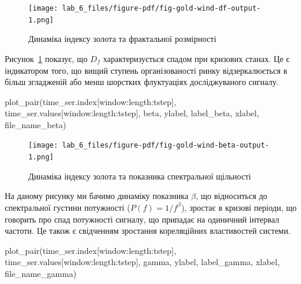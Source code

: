 \documentclass[
  letterpaper,
]{report}
\newenvironment{Shaded}{\begin{snugshade}}{\end{snugshade}}
\newcommand{\NormalTok}[1]{\textcolor[rgb]{0.00,0.23,0.31}{#1}}
\begin{document}
\begin{figure}[H]

{\centering \texttt{[image: lab\_6\_files/figure-pdf/fig-gold-wind-df-output-1.png]}

}

\caption{\label{fig-gold-wind-df}Динаміка індексу золота та фрактальної
розмірності}

\end{figure}

Рисунок~\ref{fig-gold-wind-df} показує, що \(D_f\) характеризується
спадом при кризових станах. Це є індикатором того, що вищий ступень
організованості ринку відзеркалюється в більш згладженій або менш
шорстких флуктуаціях досліджуваного сигналу.

\begin{Shaded}
\begin{Highlighting}[]
\NormalTok{plot\_pair(time\_ser.index[window:length:tstep],}
\NormalTok{          time\_ser.values[window:length:tstep],}
\NormalTok{          beta, }
\NormalTok{          ylabel, }
\NormalTok{          label\_beta,}
\NormalTok{          xlabel,}
\NormalTok{          file\_name\_beta)}
\end{Highlighting}
\end{Shaded}

\begin{figure}[H]

{\centering \texttt{[image: lab\_6\_files/figure-pdf/fig-gold-wind-beta-output-1.png]}

}

\caption{\label{fig-gold-wind-beta}Динаміка індексу золота та показника
спектральної щільності}

\end{figure}

На даному рисунку ми бачимо динаміку показника \(\beta\), що відноситься
до спектральної густини потужності (\(P(f)=1/f^{\beta}\)), зростає в
кризові періоди, що говорить про спад потужності сигналу, що припадає на
одиничний інтервал частоти. Це також є свідченням зростання кореляційних
властивостей системи.

\begin{Shaded}
\begin{Highlighting}[]
\NormalTok{plot\_pair(time\_ser.index[window:length:tstep],}
\NormalTok{          time\_ser.values[window:length:tstep],}
\NormalTok{          gamma, }
\NormalTok{          ylabel, }
\NormalTok{          label\_gamma,}
\NormalTok{          xlabel,}
\NormalTok{          file\_name\_gamma)}
\end{Highlighting}
\end{Shaded}
\end{document}
